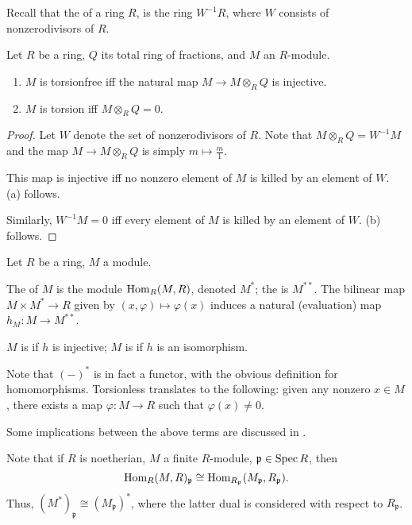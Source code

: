 \documentclass[12pt]{article}
\begin{document}
Recall that the  of a ring $R$, is the ring $W^{-1} R$, where $W$ consists of nonzerodivisors of $R$.
\begin{prop}
	Let $R$ be a ring, $Q$ its total ring of fractions, and $M$ an $R$-module.
	\begin{enumerate}[label=(\alph*)]
		\item $M$ is torsionfree iff the natural map $M \to M \otimes_{R} Q$ is injective.
		\item $M$ is torsion iff $M \otimes_{R} Q = 0$.
	\end{enumerate}
\end{prop}
\begin{proof} 
	Let $W$ denote the set of nonzerodivisors of $R$. Note that $M \otimes_{R} Q = W^{-1} M$ and the map $M \to M \otimes_{R} Q$ is simply $m \mapsto \frac{m}{1}$. 

	This map is injective iff no nonzero element of $M$ is killed by an element of $W$. (a) follows.

	Similarly, $W^{-1} M = 0$ iff every element of $M$ is killed by an element of $W$. (b) follows.
\end{proof}

\begin{defn}
	Let $R$ be a ring, $M$ a module. 

	The  of $M$ is the module $\operatorname{Hom}_{R}(M, R)$, denoted $M^{\ast}$; the  is $M^{\ast \ast}$. \newline
	The bilinear map $M \times M^{\ast} \to R$ given by $(x, \varphi) \mapsto \varphi(x)$ induces a natural (evaluation) map $h_{M} : M \to M^{\ast \ast}$. 

	$M$ is  if $h$ is injective; $M$ is  if $h$ is an isomorphism.
\end{defn}
Note that $(-)^{\ast}$ is in fact a functor, with the obvious definition for homomorphisms. Torsionless translates to the following: given any nonzero $x \in M$, there exists a map $\varphi : M \to R$ such that $\varphi(x) \neq 0$.

Some implications between the above terms are discussed in .

Note that if $R$ is noetherian, $M$ a finite $R$-module, $\mathfrak{p} \in \operatorname{Spec} R$, then
\begin{equation*} 
	\operatorname{Hom}_{R}(M, R)_{\mathfrak{p}} \cong \operatorname{Hom}_{R_{\mathfrak{p}}}(M_{\mathfrak{p}}, R_{\mathfrak{p}}).
\end{equation*}
Thus, $(M^{\ast})_{\mathfrak{p}} \cong (M_{\mathfrak{p}})^{\ast}$, where the latter dual is considered with respect to $R_{\mathfrak{p}}$. 
\end{document}
